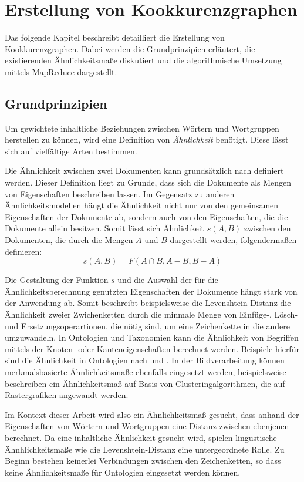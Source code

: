\chapter{Erstellung von Kookkurenzgraphen}

Das folgende Kapitel beschreibt detailliert die Erstellung von Kookkurenzgraphen. Dabei werden die Grundprinzipien erläutert, die existierenden Ähnlichkeitsmaße diskutiert und die algorithmische Umsetzung mittels MapReduce dargestellt.

\section{Grundprinzipien}

Um gewichtete inhaltliche Beziehungen zwischen Wörtern und Wortgruppen herstellen zu können, wird eine Definition von \emph{Ähnlichkeit} benötigt. Diese lässt sich auf vielfältige Arten bestimmen.

Die Ähnlichkeit zwischen zwei Dokumenten kann grundsätzlich nach \textcite{at1977} definiert werden. Dieser Definition liegt zu Grunde, dass sich die Dokumente als Mengen von Eigenschaften beschreiben lassen. Im Gegensatz zu anderen Ähnlichkeitsmodellen hängt die Ähnlichkeit nicht nur von den gemeinsamen Eigenschaften der Dokumente ab, sondern auch von den Eigenschaften, die die Dokumente allein besitzen. Somit lässt sich Ähnlichkeit \(s(A,B)\) zwischen den Dokumenten, die durch die Mengen \(A\) und \(B\) dargestellt werden, folgendermaßen definieren:
\[s(A,B) = F(A \cap B, A-B, B-A)\]
\label{similarity}

Die Gestaltung der Funktion \(s\) und die Auswahl der für die Ähnlichkeitsberechnung genutzten Eigenschaften der Dokumente hängt stark von der Anwendung ab. Somit beschreibt beispielsweise die Levenshtein-Distanz \cite{vl1966} die Ähnlichkeit zweier Zwichenketten durch die minmale Menge von Einfüge-, Lösch- und Ersetzungsoperartionen, die nötig sind, um eine Zeichenkette in die andere umzuwandeln. In Ontologien und Taxonomien kann die Ähnlichkeit von Begriffen mittels der Knoten- oder Kanteneigenschaften berechnet werden. Beispiele hierfür sind die Ähnlichkeit in Ontologien nach \textcite{pr1995} und \textcite{ps2002}. In der Bildverarbeitung können merkmalsbasierte Ähnlichkeitsmaße ebenfalls eingesetzt werden, beispielsweise beschreiben \textcite{ow2006} ein Ähnlichkeitsmaß auf Basis von Clusteringalgorithmen, die auf Rastergrafiken angewandt werden.

Im Kontext dieser Arbeit wird also ein Ähnlichkeitsmaß gesucht, dass anhand der Eigenschaften von Wörtern und Wortgruppen eine Distanz zwischen ebenjenen berechnet. Da eine inhaltliche Ähnlichkeit gesucht wird, spielen lingustische Ähnhlichkeitsmaße wie die Levenshtein-Distanz eine untergeordnete Rolle. Zu Beginn bestehen keinerlei Verbindungen zwischen den Zeichenketten, so dass keine Ähnlichkeitsmaße für Ontologien eingesetzt werden können.


